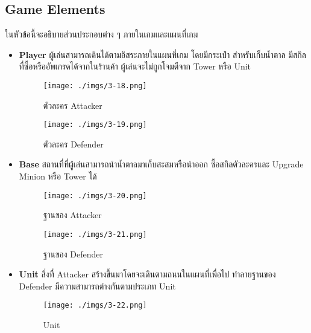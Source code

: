 \documentclass[12pt,oneside,openright,a4paper]{cpe-thai-project}
\begin{document}
\subsection{Game Elements}
ในหัวข้อนี้จะอธิบายส่วนประกอบต่าง ๆ ภายในเกมและแผนที่เกม
\begin{itemize}
  
  \item \textbf{Player} ผู้เล่นสามารถเดินได้ตามอิสระภายในแผนที่เกม โดยมีกระเป๋า
  สำหรับเก็บน้ำตาล มีสกิลที่ซื้อหรืออัพเกรดได้จากในร้านค้า
  ผู้เล่นจะไม่ถูกโจมตีจาก Tower หรือ Unit
  
    \begin{figure}[H]\centering
      \begin{minipage}{.3\textwidth}
        \centering
        \texttt{[image: ./imgs/3-18.png]}
        \caption{ตัวละคร Attacker}\label{fig:3-18}
      \end{minipage}
      \begin{minipage}{.3\textwidth}
        \centering
        \texttt{[image: ./imgs/3-19.png]}
        \caption{ตัวละคร Defender}\label{fig:3-19}
      \end{minipage}
    \end{figure}
  
  \item \textbf{Base} สถานที่ที่ผู้เล่นสามารถนำน้ำตาลมาเก็บสะสมหรือนำออก 
  ซื้อสกิลตัวละครและ Upgrade Minion หรือ Tower ได้
  
    \begin{figure}[H]\centering
      \begin{minipage}{.3\textwidth}
        \centering
        \texttt{[image: ./imgs/3-20.png]}
        \caption{ฐานของ Attacker}\label{fig:3-20}
      \end{minipage}
      \begin{minipage}{.3\textwidth}
        \centering
        \texttt{[image: ./imgs/3-21.png]}
        \caption{ฐานของ Defender}\label{fig:3-21}
      \end{minipage}
    \end{figure}
  
  \item \textbf{Unit} สิ่งที่ Attacker สร้างขึ้นมาโดยจะเดินตามถนนในแผนที่เพื่อไป
  ทำลายฐานของ Defender มีความสามารถต่างกันตามประเภท Unit
    
    \begin{figure}[H]\centering
      \texttt{[image: ./imgs/3-22.png]}
      \caption{Unit}\label{fig:3-22}
    \end{figure}
    

\end{itemize}
\end{document}
